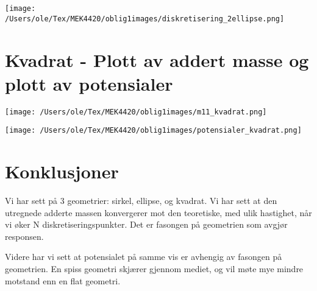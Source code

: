 \documentclass{article}
\begin{document}
{\noindent\texttt{[image: /Users/ole/Tex/MEK4420/oblig1images/diskretisering\_2ellipse.png]}
}


\section{Kvadrat - Plott av addert masse og plott av potensialer}

{\noindent\texttt{[image: /Users/ole/Tex/MEK4420/oblig1images/m11\_kvadrat.png]}
}

{\noindent\texttt{[image: /Users/ole/Tex/MEK4420/oblig1images/potensialer\_kvadrat.png]}
}

\section{Konklusjoner}
Vi har sett på 3 geometrier: sirkel, ellipse, og kvadrat. Vi har sett at den utregnede adderte massen konvergerer mot den teoretiske, med ulik hastighet, når vi øker N diskretiseringspunkter. Det er fasongen på geometrien som avgjør responsen. 

Videre har vi sett at potensialet på samme vis er avhengig av fasongen på geometrien. En spiss geometri skjærer gjennom mediet, og vil møte mye mindre motstand enn en flat geometri. 
\end{document}
